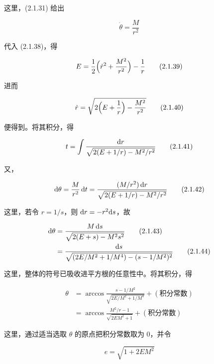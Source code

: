 这里，(2.1.31) 给出

\begin{equation}
  \dot\theta = \frac{M}{r^2}
  \tag{2.1.38}
\end{equation}

代入 (2.1.38)，得

\begin{equation}
  E = \frac{1}{2}\Bigl(\dot r^2 + \frac{M^2}{r^2}\Bigr) - \frac{1}{r}
  \tag{2.1.39}
\end{equation}

进而

\begin{equation}
  \dot r = \sqrt{2\Bigl(E + \frac{1}{r}\Bigr) - \frac{M^2}{r^2}}
  \tag{2.1.40}
\end{equation}

便得到。将其积分，得

\begin{equation}
  t = \int \frac{\mathrm{d} r}{\sqrt{2(E + 1/r) - M^2/r^2}}
  \tag{2.1.41}
\end{equation}

又，

\begin{equation}
  \mathrm{d}\theta = \frac{M}{r^2}\,\mathrm{d} t
    = \frac{(M/r^2)\,\mathrm{d} r}{\sqrt{2(E + 1/r) - M^2/r^2}}
  \tag{2.1.42}
\end{equation}

这里，若令 $r = 1/s$，则 $\mathrm{d} r = -r^2\mathrm{d} s$，故

\begin{align}
  \mathrm{d}\theta &= \frac{M\,\mathrm{d} s}{\sqrt{2(E + s) - M^2 s^2}}
    \tag{2.1.43}\\
  &= \frac{\mathrm{d} s}{\sqrt{(2E/M^2 + 1/M^4) - (s - 1/M^2)^2}}
    \tag{2.1.44}
\end{align}

这里，整体的符号已吸收进平方根的任意性中。将其积分，得

\begin{align}
  \theta &= \arccos \frac{s - 1/M^2}{\sqrt{2E/M^2 + 1/M^4}}
    + (\text{积分常数}) \tag{2.1.45}\\
  &= \arccos \frac{M^2/r - 1}{\sqrt{2EM^2 + 1}}
    + (\text{积分常数}) \tag{2.1.46}
\end{align}

这里，通过适当选取 $\theta$ 的原点把积分常数取为 $0$，并令

\begin{equation}
  e = \sqrt{1 + 2EM^2}
  \tag{2.1.47}
\end{equation}

